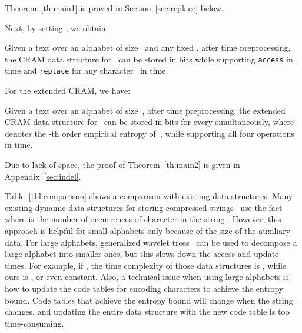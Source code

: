 \documentclass{llncs}
\begin{document}
Theorem~\ref{th:main1} is proved in Section~\ref{sec:replace} below.

Next, by setting
,
we obtain:
\begin{corollary}
Given a text  over an alphabet of size~
and any fixed ,
after  time preprocessing,
the CRAM data structure for~ can be stored in
 bits
while supporting \textnormal{\texttt{access}} in  time and
\textnormal{\texttt{replace}} for any character~
in  time.
\end{corollary}


\smallskip

For the extended CRAM, we have:
\begin{theorem}\label{th:main2}
Given a text  over an alphabet of size~,
after  time preprocessing,
the extended CRAM data structure for~ can be stored in
 bits
for every  simultaneously,
where  denotes the -th order empirical entropy of~,
while supporting all four operations in  time.
\end{theorem}

Due to lack of space, the proof of
Theorem~\ref{th:main2} is given in Appendix~\ref{sec:indel}.


\medskip

Table~\ref{tbl:comparison} shows a comparison with existing data structures.
Many existing dynamic data structures for storing compressed
strings~\cite{GNtcs09,HeMun10,MNtalg08,NavSad10}
use the fact  where 
is the number of occurrences of character  in the string .
However, this approach is helpful for small alphabets only because of the size
of the auxiliary data.
For large alphabets, generalized wavelet trees~\cite{FMMNtalg07} can be used
to decompose a large alphabet into smaller ones, but this slows down the
access and update times.
For example, if , the time complexity of those data
structures is , 
while ours is , or even constant.
Also, a technical issue when using large alphabets is how to update the code
tables for encoding characters to achieve the entropy bound.
Code tables that achieve the entropy bound will change when the string
changes, and updating the entire data structure with the new code table is
too time-consuming.
\end{document}
